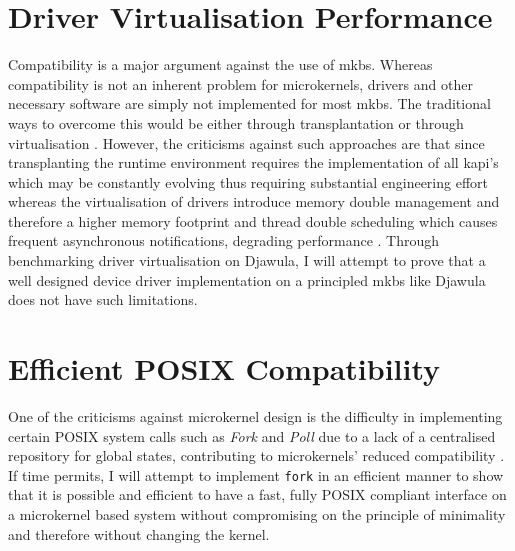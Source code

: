 \documentclass[../thesis.tex]{subfiles}
\begin{document}
\section{Driver Virtualisation Performance}
Compatibility is a major argument against the use of \gls{mkbs}.  Whereas compatibility is not an inherent problem for microkernels, drivers and other necessary software are simply not implemented for most \gls{mkbs}. The traditional ways to overcome this would be either through transplantation \citep{K42:LKIntern,Ford_BBLLS_97,Goel_Duchamp_96}  or through virtualisation \citep{LeVasseur_USG_04}. However, the criticisms against such approaches are that since transplanting the runtime environment requires the implementation of all \gls{kapi}'s which may be constantly evolving thus requiring substantial engineering effort whereas the virtualisation of drivers introduce memory double management and therefore a higher memory footprint and thread double scheduling which causes frequent asynchronous notifications, degrading performance \citep{Chen_JWLLLWHLYWYPX_24}. Through benchmarking driver virtualisation on Djawula, I will attempt to prove that a well designed device driver implementation on a principled \gls{mkbs} like Djawula does not have such limitations. 

\section{Efficient POSIX Compatibility}
One of the criticisms against microkernel design is the difficulty in implementing certain POSIX system calls such as \textit{Fork} and \textit{Poll} due to a lack of a centralised repository for global states, contributing to microkernels' reduced compatibility \citep{Chen_JWLLLWHLYWYPX_24}. If time permits, I will attempt to implement \texttt{fork} in an efficient manner to show that it is possible and efficient to have a fast, fully POSIX compliant interface on a microkernel based system without compromising on the principle of minimality and therefore without changing the kernel.  
\end{document}
